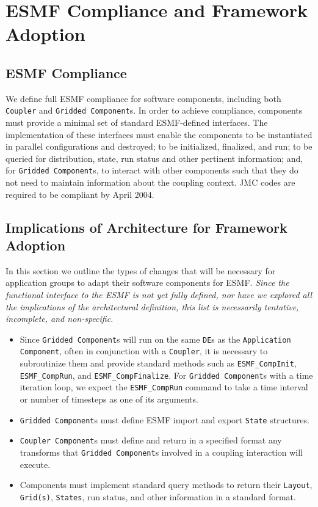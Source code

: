 \section{ESMF Compliance and Framework Adoption}
\label{sec:implications}

\subsection{ESMF Compliance}

We define full ESMF compliance for software components, including
both {\tt Coupler} and {\tt Gridded Component}s.  In order to 
achieve compliance, 
components must provide a minimal set of standard ESMF-defined 
interfaces.  The implementation of these interfaces must enable the  
components to be instantiated in parallel configurations
and destroyed; to be initialized, finalized, and run; to be queried for 
distribution, state, run status and other pertinent information;
and, for {\tt Gridded Component}s, to interact with other components such
that they do not need to maintain information about the coupling context.
JMC codes are required to be compliant by April 2004.

\subsection{Implications of Architecture for Framework Adoption}

In this section we outline the types of changes that will be necessary for
application groups to adapt their software components for ESMF.  {\it Since the
functional interface to the ESMF is not yet fully defined, nor have we 
explored all the implications of the architectural definition, this list is 
necessarily tentative, incomplete, and non-specific.}

\begin{itemize}
\item Since {\tt Gridded Component}s will run on the same 
{\tt DE}s as the {\tt Application Component}, often in conjunction 
with a {\tt Coupler}, 
it is necessary to subroutinize
them and provide standard methods such as {\tt ESMF\_CompInit}, 
{\tt ESMF\_CompRun}, and {\tt ESMF\_CompFinalize}.  For {\tt Gridded 
Component}s
with a time iteration loop, we expect the {\tt ESMF\_CompRun} command to 
take a time interval or number of timesteps as one of its arguments.
\item {\tt Gridded Component}s must define ESMF import and export {\tt State} 
structures.
\item {\tt Coupler Component}s must define and return in a specified 
format any transforms that {\tt Gridded Component}s involved 
in a coupling interaction will execute.
\item Components must implement standard query methods to return
their {\tt Layout}, {\tt Grid(s)}, {\tt States}, run status, and other 
information in a standard format.
\end{itemize}

